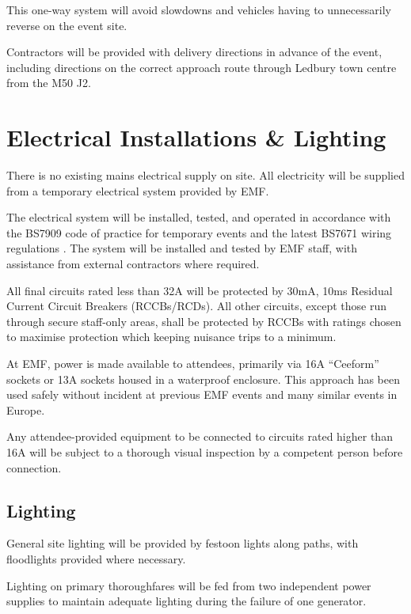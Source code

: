 This one-way system will avoid slowdowns and vehicles having to unnecessarily
reverse on the event site.

Contractors will be provided with delivery directions in advance of the event,
including directions on the correct approach route through Ledbury town centre
from the M50 J2.

\newpage

\section{Electrical Installations \& Lighting}\label{power}

There is no existing mains electrical supply on site. All electricity will be
supplied from a temporary electrical system provided by EMF.

The electrical system will be installed, tested, and operated in accordance with
the BS7909 code of practice for temporary events \cite{bs7909} and the latest
BS7671 wiring regulations \cite{bs7671}.  The system will be
installed and tested by EMF staff, with assistance from external contractors
where required.

All final circuits rated less than 32A will be protected by 30mA, 10ms Residual
Current Circuit Breakers (RCCBs/RCDs).  All other circuits, except those run
through secure staff-only areas, shall be protected by RCCBs with ratings chosen
to maximise protection which keeping nuisance trips to a minimum.

At EMF, power is made available to attendees, primarily via 16A ``Ceeform''
sockets or 13A sockets housed in a waterproof enclosure. This approach has been
used safely without incident at previous EMF events and many similar events in Europe.

Any attendee-provided equipment to be connected to circuits rated higher than 16A
will be subject to a thorough visual inspection by a competent person before connection.

\subsection{Lighting}
General site lighting will be provided by festoon lights along paths,
with floodlights provided where necessary.

Lighting on primary thoroughfares will be fed from two independent power supplies
to maintain adequate lighting during the failure of one generator.

\newpage

